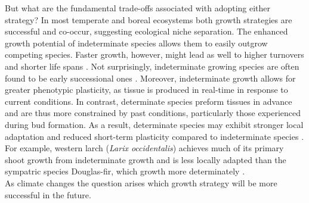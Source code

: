 \documentclass{article}
\begin{document}
	But what are the fundamental trade-offs associated with adopting either strategy? In most temperate and boreal ecosystems both growth strategies are successful and co-occur, suggesting ecological niche separation. The enhanced growth potential of indeterminate species allows them to easily outgrow competing species. Faster growth, however, might lead as well to higher turnovers and shorter life spans \citep{brienenForestCarbonSink2020b, milletRelationshipArchitectureSuccessional1999}. Not surprisingly, indeterminate growing species are often found to be early successional ones \citep{marksRelationExtensionGrowth1975, boojhGrowthStrategyTrees1982}.
Moreover, indeterminate growth allows for greater phenotypic plasticity, as tissue is produced in real-time in response to current conditions. In contrast, determinate species preform tissues in advance and are thus more constrained by past conditions, particularly those experienced during bud formation. As a result, determinate species may exhibit stronger local adaptation and reduced short-term plasticity compared to indeterminate species  \citep{leitesForestTreeSpecies2023}. For example, western larch (\textit{Larix occidentalis}) achieves much of its primary shoot growth from indeterminate growth %
	and is less locally adapted than the sympatric species Douglas-fir, which growth more determinately \citep{roskillyWeakLocalAdaptation2024}.\\

	As climate changes the question arises which growth strategy will be more successful in the future.
\end{document}
